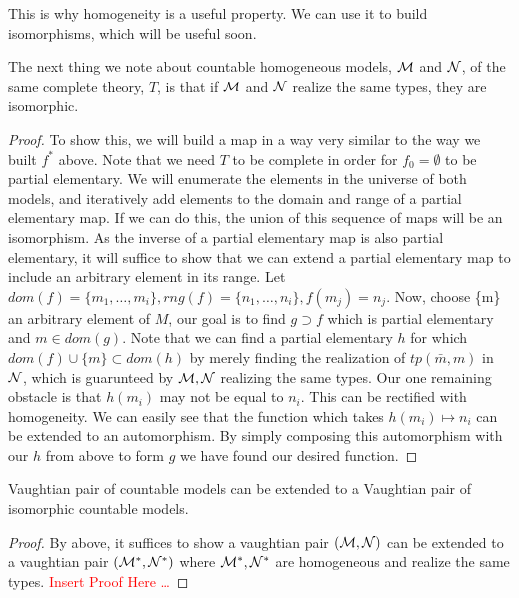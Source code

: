 This is why homogeneity is a useful property. We can use it to build isomorphisms, which will be useful soon. 

\begin{lemma}\label{lemma_types_isomorphism}
The next thing we note about countable homogeneous models, \(\mathcal{M}\) and \(\mathcal{N}\), of the same complete theory, \(T\), is that if \(\mathcal{M}\) and \(\mathcal{N}\) realize the same types, they are isomorphic.
\end{lemma}

\begin{proof}\label{proof_types_isomorphism}
To show this, we will build a map in a way very similar to the way we built \(f^*\) above. 
Note that we need \(T\) to be complete in order for \(f_0=\emptyset\) to be partial elementary.
We will enumerate the elements in the universe of both models, and iteratively add elements to the domain and range of a partial elementary map. 
If we can do this, the union of this sequence of maps will be an isomorphism.
As the inverse of a partial elementary map is also partial elementary, it will suffice to show that we can extend a partial elementary map to include an arbitrary element in its range. 
Let \(dom(f) = \{m_1, \ldots, m_i\}, rng(f) = \{n_1, \ldots, n_i\}, f(m_j) = n_j\).
Now, choose \{m\} an arbitrary element of \(M\), our goal is to find \(g \supset f\) which is partial elementary and \(m \in dom(g)\).
Note that we can find a partial elementary \(h\) for which \(dom(f) \cup \{m\} \subset dom(h)\) by merely finding the realization of \(tp(\bar{m}, m)\) in \(\mathcal{N}\), which is guarunteed by \(\mathcal{M}, \mathcal{N}\) realizing the same types. 
Our one remaining obstacle is that \(h(m_i)\) may not be equal to \(n_i\). 
This can be rectified with homogeneity. We can easily see that the function which takes \(h(m_i) \mapsto n_i\) can be extended to an automorphism. 
By simply composing this automorphism with our \(h\) from above to form \(g\) we have found our desired function. 
\end{proof}


\begin{theorem}\label{theorem_vaughtian_pairs_countable_isomorphic}
Vaughtian pair of countable models can be extended to a Vaughtian pair of isomorphic countable models.
\end{theorem}

\begin{proof}
By above, it suffices to show a vaughtian pair \((\mathcal{M}, \mathcal{N})\) can be extended to a vaughtian pair \((\mathcal{M}^*, \mathcal{N}^*)\) where \(\mathcal{M}^*, \mathcal{N}^*\) are homogeneous and realize the same types. 
\textcolor{red}{Insert Proof Here \ldots}
\end{proof}


